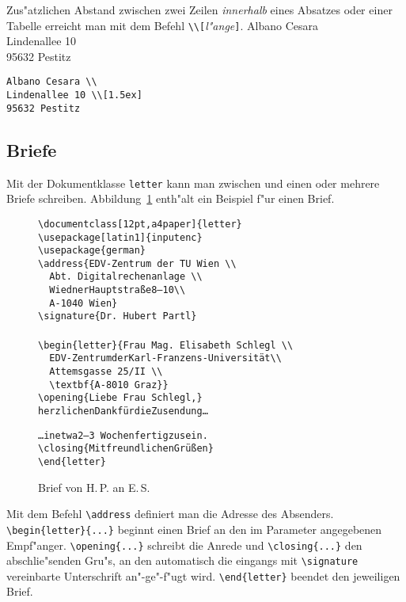 Zus"atzlichen Abstand zwischen zwei Zeilen \emph{innerhalb}
eines Absatzes oder einer Tabelle erreicht man mit dem Befehl
\verb|\\[|\textit{l"ange}\verb|]|.
\exa
Albano Cesara \\
Lindenallee 10 \\[1.5ex]
95632 Pestitz
\exb
\begin{verbatim}
Albano Cesara \\
Lindenallee 10 \\[1.5ex]
95632 Pestitz
\end{verbatim}
\exc

\smallskip
 
 
\subsection{Briefe}\label{briefe}
 
Mit der Dokumentklasse \texttt{letter} kann man zwischen
\verb|| und \verb|| einen oder
mehrere Briefe schreiben. 
Abbildung~\ref{brief} enth"alt ein Beispiel f"ur einen Brief.

\begin{figure}[ht] %
\oben{11cm}
\begin{alltt}
\verb+\documentclass[12pt,a4paper]{letter}+
\verb+\usepackage[latin1]{inputenc}+
\verb+\usepackage{german}+
\verb+\address{EDV-Zentrum der TU Wien \\+
\verb+  Abt. Digitalrechenanlage \\+
\verb+  +Wiedner Hauptstra\ss{}e 8--10 \verb+\\+
\verb+  A-1040 Wien}+
\verb+\signature{Dr. Hubert Partl}+
\verb++
\verb+\begin{letter}{Frau Mag. Elisabeth Schlegl \\+
\verb+  +EDV-Zentrum der Karl-Franzens-Universit\"at \verb+\\+
\verb+  Attemsgasse 25/II \\+
\verb+  \textbf{A-8010 Graz}}+
\verb+\opening{Liebe Frau Schlegl,}+
herzlichen Dank f\"ur die Zusendung \dots

\dots in etwa 2--3~Wochen fertig zu sein.
\verb+\closing{+Mit freundlichen Gr\"u\ss{}en\verb+}+
\verb+\end{letter}+
\verb++
\end{alltt}
\unten
\caption{Brief von H.\,P. an E.\,S.} \label{brief}
\end{figure}

\begin{sloppypar}
Mit dem Befehl \verb|\address| definiert man die Adresse des Absenders.
\verb|\begin{letter}{...}| beginnt einen Brief an den im
Parameter angegebenen Empf"anger.
\verb|\opening{...}| schreibt die Anrede 
und \verb|\closing{...}| den abschlie"senden Gru"s, 
an den automatisch die eingangs mit
\verb|\signature| vereinbarte Unterschrift an"-ge"-f"ugt wird.
\verb|\end{letter}| beendet den jeweiligen Brief.
\end{sloppypar}

